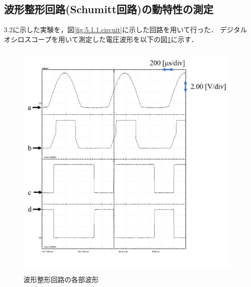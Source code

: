 \documentclass[10pt, a4j, dvipdfmx]{jarticle}
\begin{document}
\subsection{波形整形回路(Schumitt回路)の動特性の測定}
3.2に示した実験を，図\ref{fig:5.1.1.circuit}に示した回路を用いて行った．
デジタルオシロスコープを用いて測定した電圧波形を以下の図\ref{fig:5.2.graph}に示す．
\begin{figure}[H]
	\centering
	\includegraphics[height=120mm]{images/Experiment/5_2_graph.png}
	\caption{波形整形回路の各部波形}
	\label{fig:5.2.graph}
\end{figure}

\newpage
\end{document}
